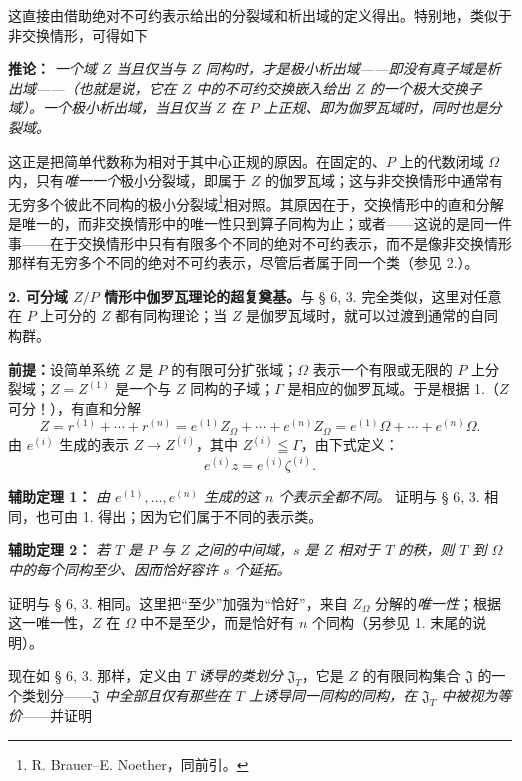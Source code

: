 \documentclass[11pt]{article}
\providecommand{\srcspaced}[1]{#1}
\begin{document}
这直接由借助绝对不可约表示给出的分裂域和析出域的定义得出。特别地，类似于非交换情形，可得如下

\noindent\textbf{\srcspaced{推论：}} \emph{一个域 \(Z\) 当且仅当与 \(Z\) 同构时，才是极小析出域——即没有真子域是析出域——（也就是说，它在 \(Z\) 中的不可约交换嵌入给出 \(Z\) 的一个极大交换子域）。一个极小析出域，当且仅当 \(Z\) 在 \(P\) 上正规、即为伽罗瓦域时，同时也是分裂域。}

这正是把简单代数称为相对于其中心正规的原因。在固定的、\(P\) 上的代数闭域 \(\Omega\) 内，只有\emph{唯一一个}极小分裂域，即属于 \(Z\) 的伽罗瓦域；这与非交换情形中通常有无穷多个彼此不同构的极小分裂域\footnote{R. Brauer--E. Noether，同前引。}相对照。其原因在于，交换情形中的直和分解是唯一的，而非交换情形中的唯一性只到算子同构为止；或者——这说的是同一件事——在于交换情形中只有有限多个不同的绝对不可约表示，而不是像非交换情形那样有无穷多个不同的绝对不可约表示，尽管后者属于同一个类（参见 2.）。

\medskip
\noindent\textbf{\srcspaced{2. 可分域 \(Z/P\) 情形中伽罗瓦理论的超复奠基。}}\quad 与 § 6, 3. 完全类似，这里对任意在 \(P\) 上可分的 \(Z\) 都有同构理论；当 \(Z\) 是伽罗瓦域时，就可以过渡到通常的自同构群。

\medskip
\noindent\textbf{\srcspaced{前提：}}\quad 设简单系统 \(Z\) 是 \(P\) 的有限可分扩张域；\(\Omega\) 表示一个有限或无限的 \(P\) 上分裂域；\(Z=Z^{(1)}\) 是一个与 \(Z\) 同构的子域；\(\Gamma\) 是相应的伽罗瓦域。于是根据 1.（\(Z\) 可分！），有直和分解
\[
        Z=r^{(1)}+\cdots+r^{(n)}
        =e^{(1)}Z_\Omega+\cdots+e^{(n)}Z_\Omega
        =e^{(1)}\Omega+\cdots+e^{(n)}\Omega .
\]
由 \(e^{(i)}\) 生成的表示 \(Z\to Z^{(i)}\)，其中 \(Z^{(i)}\leqq\Gamma\)，由下式定义：
\[
        e^{(i)}z=e^{(i)}\zeta^{(i)}.
\]

\noindent\textbf{\srcspaced{辅助定理 1：}} \emph{由 \(e^{(1)},\ldots,e^{(n)}\) 生成的这 \(n\) 个表示全都不同。} 证明与 § 6, 3. 相同，也可由 1. 得出；因为它们属于不同的表示类。

\noindent\textbf{\srcspaced{辅助定理 2：}} \emph{若 \(T\) 是 \(P\) 与 \(Z\) 之间的中间域，\(s\) 是 \(Z\) 相对于 \(T\) 的秩，则 \(T\) 到 \(\Omega\) 中的每个同构至少、因而恰好容许 \(s\) 个延拓。}

证明与 § 6, 3. 相同。这里把“至少”加强为“恰好”，来自 \(Z_\Omega\) 分解的\emph{唯一性}；根据这一唯一性，\(Z\) 在 \(\Omega\) 中不是至少，而是恰好有 \(n\) 个同构（另参见 1. 末尾的说明）。

现在如 § 6, 3. 那样，定义由 \(T\) \emph{诱导的类划分} \(\mathfrak J_T\)，它是 \(Z\) 的有限同构集合 \(\mathfrak J\) 的一个类划分——\emph{\(\mathfrak J\) 中全部且仅有那些在 \(T\) 上诱导同一同构的同构，在 \(\mathfrak J_T\) 中被视为等价}——并证明
\end{document}
